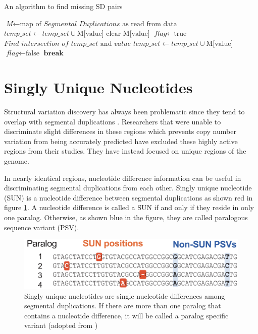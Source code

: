 \begin{algorithm}
\caption{An algorithm to find missing SD pairs}
\label{missingPairs}
\begin{algorithmic}[1]
\State $\textit{M} \gets \text{map of }\textit{Segmental Duplications}\text{ as read from data}$
\State $\textit{temp\_set} \gets \textit{temp\_set} \cup \text{M{[value]}}$
\State $\text{clear M{[value]}}$
\EndFor
{}
\State $\textit{flag} \gets \text{true}$
\State $\textit{Find intersection of }\textit{temp\_set}\text{ and }\textit{value}$
\State $\textit{temp\_set} \gets \textit{temp\_set} \cup \text{M{[value]}}$
\State $\textit{flag} \gets \text{false}$
\EndIf
\EndFor
{}
\State $\textbf{break}$
\EndIf
\EndWhile
\EndFor
\EndProcedure
\end{algorithmic}
\end{algorithm}

\section{Singly Unique Nucleotides} \label{section:sun}
Structural variation discovery has always been problematic since they tend to overlap with segmental duplications \cite{sudmant2010diversity}. Researchers that were unable to discriminate slight differences in these regions which prevents copy number variation from being accurately predicted have excluded these highly active regions from their studies. They have instead focused on unique regions of the genome.

In nearly identical regions, nucleotide difference information can be useful in discriminating segmental duplications from each other. Singly unique nucleotide (SUN) is a nucleotide difference between segmental duplications as shown red in figure \ref{singlyUniqueNucleotide}. A nucleotide difference is called a SUN if and only if they reside in only one paralog. Otherwise, as shown blue in the figure, they are called  paralogous sequence variant (PSV). 
\begin{figure}[ht]
    \centering
    \includegraphics[scale=0.4]{images/singlyUniqueNucleotide.png}
    \caption{Singly unique nucleotides are single nucleotide differences among segmental duplications. If there are more than one paralog that contains a nucleotide difference, it will be called a paralog specific variant (adopted from \cite{sudmant2010diversity})}
    \label{singlyUniqueNucleotide}
\end{figure}

